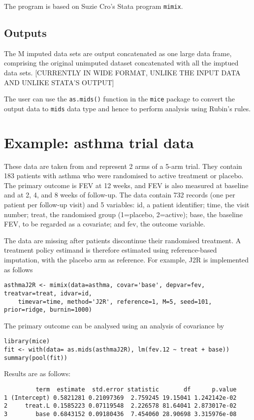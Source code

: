 The program is based on Suzie Cro’s Stata program \texttt{mimix}.

\subsection{Outputs}

The M imputed data sets are output concatenated as one large data frame, comprising the 
original unimputed dataset concatenated with all the imptued data sets.
[CURRENTLY IN WIDE FORMAT, UNLIKE THE INPUT DATA AND UNLIKE STATA'S OUTPUT] 

The user can use the \texttt{as.mids()} function in the \texttt{mice} package to convert the output data  to \texttt{mids} data type and hence to perform analysis using Rubin's rules.



\section{Example: asthma trial data}

These data are taken from \citet{Cro++16} and represent 2 arms of a 5-arm trial. 
They contain 183 patients with asthma who were randomised to active treatment or placebo. 
The primary outcome is FEV at 12 weeks, and FEV is also measured at baseline and at 2, 4, and 8 weeks of follow-up.
The data contain 732 records (one per patient per follow-up visit) and 5 variables: 
id, a patient identifier; 
time, the visit number; 
treat, the randomised group (1=placebo, 2=active); 
base, the baseline FEV, to be regarded as a covariate;
and fev, the outcome variable.

The data are missing after patients discontinue their randomised treatment. 
A treatment policy estimand is therefore estimated using reference-based imputation, with the placebo arm as reference. 
For example, J2R is implemented as follows
\begin{verbatim}
asthmaJ2R <- mimix(data=asthma, covar='base', depvar=fev, treatvar=treat, idvar=id, 
    timevar=time, method='J2R', reference=1, M=5, seed=101, prior=ridge, burnin=1000)
\end{verbatim}

The primary outcome can be analysed using an analysis of covariance by
\begin{verbatim}
library(mice)     
fit <- with(data= as.mids(asthmaJ2R), lm(fev.12 ~ treat + base))
summary(pool(fit))    
\end{verbatim}
Results are as follows:
\begin{verbatim}
         term  estimate  std.error statistic       df      p.value
1 (Intercept) 0.5821281 0.21097369  2.759245 19.15041 1.242142e-02
2     treat.L 0.1585223 0.07119548  2.226578 81.64041 2.873017e-02
3        base 0.6843152 0.09180436  7.454060 28.90698 3.315976e-08
\end{verbatim}

